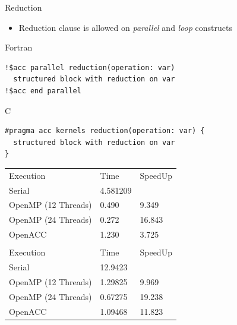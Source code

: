 \documentclass[10pt,t]{beamer}
\begin{document}
\begin{frame}{\small Reduction}
  \begin{itemize}
    \item Reduction clause is allowed on \textit{parallel} and \textit{loop} constructs
  \end{itemize}
  \begin{exampleblock}{Fortran}
    \begin{lstlisting}[basicstyle=\tiny\ttfamily,language=OmpFortran]
!$acc parallel reduction(operation: var)
  structured block with reduction on var
!$acc end parallel
    \end{lstlisting}
  \end{exampleblock}
  \begin{exampleblock}{C}
    \begin{lstlisting}[basicstyle=\tiny\ttfamily,language=OmpC]
#pragma acc kernels reduction(operation: var) {
  structured block with reduction on var
}
    \end{lstlisting}
  \end{exampleblock}

  \begin{exampleblock}{}
    \begin{center}
      \begin{tabular}{|b|b|b|}
        \hline
        \rowcolor{lublue}\multicolumn{3}{|c|}{Fortran}\\
        \hline
        \rowcolor{lublue}Execution & Time & SpeedUp \\
        \hline
        Serial & 4.581209 &  \\
        OpenMP (12 Threads) & 0.490 & 9.349 \\
        OpenMP (24 Threads) & 0.272 & 16.843 \\
        OpenACC & 1.230 & 3.725 \\
        \hline
        \rowcolor{lublue}\multicolumn{3}{|c|}{C}\\
        \hline
        \rowcolor{lublue}Execution & Time & SpeedUp \\
        \hline
        Serial & 12.9423 &  \\
        OpenMP (12 Threads) & 1.29825 & 9.969 \\
        OpenMP (24 Threads) & 0.67275 & 19.238 \\
        OpenACC & 1.09468  & 11.823 \\
        \hline
        
      \end{tabular}
    \end{center}
  \end{exampleblock}
\end{frame}
\end{document}
